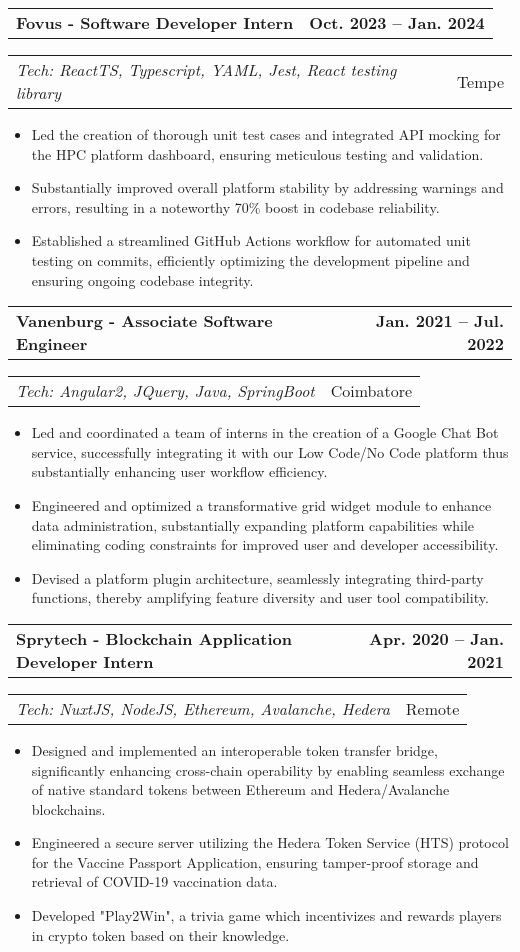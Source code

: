 \documentclass[letterpaper,11pt]{article}
\makeatletter
\newcommand{\resumeItem}[1]{
  \item\small{
    {#1 \vspace{-2pt}}
  }
}
\newcommand{\resumeSubheading}[2]{
  \vspace{-2pt}\item
    \begin{tabular*}{1.0\textwidth}[t]{l@{\extracolsep{\fill}}r}
      \textbf{#1} & \textbf{\small #2} \\
    \end{tabular*}\vspace{-7pt}
}
\newcommand{\resumeSubText}[2]{
  \vspace{-14pt}\item
    \begin{tabular*}{1.0\textwidth}[t]{l@{\extracolsep{\fill}}r}
      {#1} & {\small #2} \\
    \end{tabular*}\vspace{-7pt}
}
\newcommand{\resumeItemListStart}{\begin{itemize}}
\newcommand{\resumeItemListEnd}{\end{itemize}\vspace{-5pt}}
\makeatother
\begin{document}
    \resumeSubheading
      {Fovus - Software Developer Intern}{Oct. 2023 -- Jan. 2024}
    \resumeSubText {\emph{Tech: ReactTS, Typescript, YAML, Jest, React testing library}}{Tempe}
      \resumeItemListStart
        \resumeItem{Led the creation of thorough unit test cases and integrated API mocking for the HPC platform dashboard, ensuring meticulous testing and validation.}
        \resumeItem{Substantially improved overall platform stability by addressing warnings and errors, resulting in a noteworthy 70\% boost in codebase reliability.}
        \resumeItem{Established a streamlined GitHub Actions workflow for automated unit testing on commits, efficiently optimizing the development pipeline and ensuring ongoing codebase integrity.}
      \resumeItemListEnd

    \resumeSubheading
      {Vanenburg - Associate Software Engineer}{Jan. 2021 -- Jul. 2022}
    \resumeSubText {\emph{Tech: Angular2, JQuery, Java, SpringBoot}}{Coimbatore}
      \resumeItemListStart
        \resumeItem{Led and coordinated a team of interns in the creation of a Google Chat Bot service, successfully integrating it with our Low Code/No Code platform thus substantially enhancing user workflow efficiency.}
        \resumeItem{Engineered and optimized a transformative grid widget module to enhance data administration, substantially expanding platform capabilities while eliminating coding constraints for improved user and developer accessibility.}
        \resumeItem{Devised a platform plugin architecture, seamlessly integrating third-party functions, thereby amplifying feature diversity and user tool compatibility.}
      \resumeItemListEnd

    \resumeSubheading
      {Sprytech - Blockchain Application Developer Intern}{Apr. 2020 -- Jan. 2021}
      \resumeSubText{\emph{Tech: NuxtJS, NodeJS, Ethereum, Avalanche, Hedera}}{Remote}
      \resumeItemListStart
        \resumeItem{Designed and implemented an interoperable token transfer bridge, significantly enhancing cross-chain operability by enabling seamless exchange of native standard tokens between Ethereum and Hedera/Avalanche blockchains.}
        \resumeItem{Engineered a secure server utilizing the Hedera Token Service (HTS) protocol for the Vaccine Passport Application, ensuring tamper-proof storage and retrieval of COVID-19 vaccination data.}
        \resumeItem{Developed "Play2Win", a trivia game which incentivizes and rewards players in crypto token based on their knowledge.}
    \resumeItemListEnd
    
    
\end{document}
